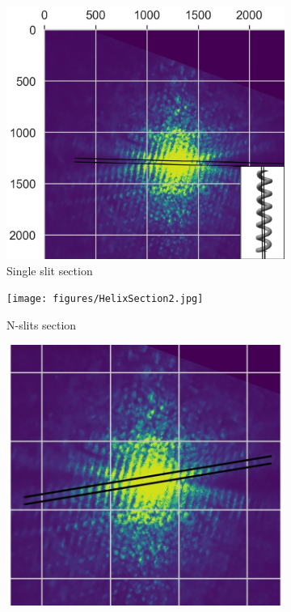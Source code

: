 \begin{figure}[H]
    \centering
    \begin{subfigure}{0.48\columnwidth}
        \centering
        \includegraphics[width=\columnwidth]{figures/HelixSection1.png} %
        \caption{Single slit section}
        \label{fig:HelixSection1}
    \end{subfigure}
    \begin{subfigure}{0.48\columnwidth}
        \centering
        \texttt{[image: figures/HelixSection2.jpg]}
        \caption{N-slits section}
        \label{fig:HelixSection2}
    \end{subfigure}
    \begin{subfigure}{0.46\columnwidth}
        \centering
        \includegraphics[width=\columnwidth]{figures/HelixSection4.jpg} %

\end{subfigure}
\end{figure}
